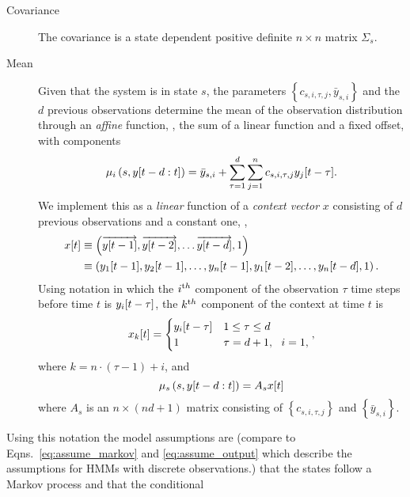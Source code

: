 \begin{description}
\item[Covariance] The covariance is a state dependent positive
  definite $n\times n$ matrix $\Sigma_s$.
\item[Mean] Given that the system is in state $s$, the parameters
  $\left\{ c_{s,i,\tau,j}, \bar y_{s,i} \right\}$ and the $d$ previous
  observations determine the mean of the observation distribution
  through an \emph{affine} function, \ie, the sum of a linear function
  and a fixed offset, with components
  \begin{equation}
    \label{eq:ARVGout1}
    \mu_i\left(s,y[t-d:t]\right) = \bar y_{s,i} + \sum_{\tau =
    1}^d \sum_{j=1}^n c_{s,i,\tau,j} {y_j}{[t-\tau]}.
  \end{equation}
  We implement this as a \emph{linear} function of a \emph{context
    vector} $x$ consisting of $d$ previous observations and a constant
  one, \ie,
  \begin{align*}
    {x}{[t]} & \equiv \left( \overrightarrow{{y}{[t-1]}},
      \overrightarrow{{y}{[t-2]}},\ldots
      \overrightarrow{{y}{[t-d]}}, 1\right)\\
    & \equiv \left({y_1}{[t-1]}, {y_2}{[t-1]}, \ldots,
      {y_n}{[t-1]}, {y_1}{[t-2]}, \ldots, {y_n}{[t-d]}, 1 \right).
  \end{align*}
  Using notation in which the $i^{\text th}$ component of the observation
  $\tau$ time steps before time $t$ is ${y_i}{[t-\tau]}$, the $k^{\text th}$
  component of the context at time $t$ is
  \begin{equation}
    \label{eq:context}
    {x_{k}}{[t]} = \begin{cases} {y_i}{[t-\tau]} & 1\leq \tau \leq d
    \\ 1 & \tau = d+1,~~ i = 1, \end{cases},
  \end{equation}
  where $k=n\cdot(\tau-1) + i$, and
  \begin{equation}
    \label{eq:ARVGout2}
    \mu_s\left(s,y[t-d:t]\right) = A_s {x}{[t]}
  \end{equation}
  where $A_s$ is an $n\times(nd+1)$ matrix consisting of $\left\{
    c_{s,i,\tau,j} \right\}$ and $\left\{ \bar y_{s,i} \right\}$.
\end{description}
Using this notation the model assumptions are (compare to
Eqns.~\eqref{eq:assume_markov} and \eqref{eq:assume_output} which
describe the assumptions for HMMs with discrete observations.) that
the states follow a Markov process and that the conditional

